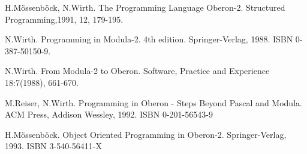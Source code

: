 \begin{thebibliography}{Wirth88}

H.M\"ossenb\"ock,  N.Wirth.  The  Programming  Language  Oberon-2.
Structured Programming,1991, 12, 179-195.

N.Wirth. Programming in Modula-2. 4th edition. Springer-Verlag,
1988. ISBN 0-387-50150-9.

N.Wirth.  From  Modula-2  to  Oberon.  Software,  Practice  and
Experience 18:7(1988), 661-670.

M.Reiser, N.Wirth. Programming in Oberon - Steps  Beyond  Pascal
and Modula. ACM Press, Addison Wessley, 1992. ISBN 0-201-56543-9

H.M\"ossenb\"ock. Object Oriented Programming in Oberon-2. 
Springer-Verlag, 1993. ISBN 3-540-56411-X

\end{thebibliography}
